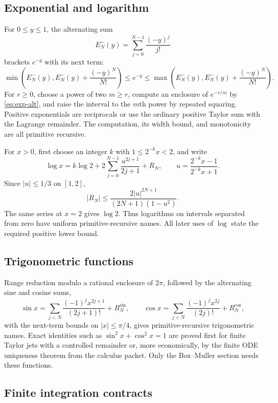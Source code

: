 \subsection{Exponential and logarithm}

For $0\le y\le1$, the alternating sum
\[
 E_N^-(y)=\sum_{j=0}^{N-1}\frac{(-y)^j}{j!}
\]
brackets $e^{-y}$ with its next term:
\begin{equation}\label{eq:exp-alt}
  \min\left(E_N^-(y),E_N^-(y)+\frac{(-y)^N}{N!}\right)
  \le e^{-y}\le
  \max\left(E_N^-(y),E_N^-(y)+\frac{(-y)^N}{N!}\right).
\end{equation}
For $r\ge0$, choose a power of two $m\ge r$, compute an enclosure of $e^{-r/m}$ by \eqref{eq:exp-alt}, and raise the interval to the $m$th power by repeated squaring.  Positive exponentials are reciprocals or use the ordinary positive Taylor sum with the Lagrange remainder.  The computation, its width bound, and monotonicity are all primitive recursive.

For $x>0$, first choose an integer $k$ with $1\le 2^{-k}x<2$, and write
\[
 \log x=k\log2+2\sum_{j=0}^{N-1}
   \frac{u^{2j+1}}{2j+1}+R_N,
 \qquad u=\frac{2^{-k}x-1}{2^{-k}x+1}.
\]
Since $|u|\le1/3$ on $[1,2]$,
\begin{equation}\label{eq:log-tail}
 |R_N|\le \frac{2|u|^{2N+1}}{(2N+1)(1-u^2)}.
\end{equation}
The same series at $x=2$ gives $\log2$.  Thus logarithms on intervals separated from zero have uniform primitive-recursive names.  All later uses of $\log$ state the required positive lower bound.

\subsection{Trigonometric functions}

Range reduction modulo a rational enclosure of $2\pi$, followed by the alternating sine and cosine sums,
\[
 \sin x=\sum_{j<N}\frac{(-1)^j x^{2j+1}}{(2j+1)!}+R_N^{\sin},
 \qquad
 \cos x=\sum_{j<N}\frac{(-1)^j x^{2j}}{(2j)!}+R_N^{\cos},
\]
with the next-term bounds on $|x|\le\pi/4$, gives primitive-recursive trigonometric names.  Exact identities such as $\sin^2x+\cos^2x=1$ are proved first for finite Taylor jets with a controlled remainder or, more economically, by the finite ODE uniqueness theorem from the calculus packet.  Only the Box--Muller section needs these functions.

\subsection{Finite integration contracts}

